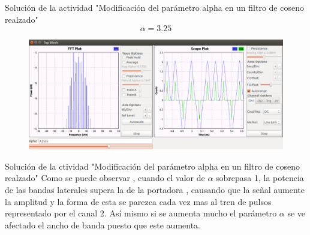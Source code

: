 \begin{frame}{Solución de la actividad "Modificación del parámetro alpha en un filtro de coseno realzado"}
$$\alpha=3.25$$
\begin{figure}
\includegraphics[width=1.05\textwidth]{soluciones/actividad-5-1/pdf/lab5_10.pdf}
\end{figure}
\end{frame}
\begin{frame}{Solución de la ctividad "Modificación del parámetro alpha en un filtro de coseno realzado"}
\justifying
Como se puede observar , cuando el valor de $\alpha$ sobrepasa 1, la potencia de las bandas laterales supera la de la portadora , causando que la señal aumente la amplitud y la forma de esta se parezca cada vez mas al tren de pulsos representado por el canal 2. Así mismo si se aumenta mucho el parámetro $\alpha$ se ve afectado el ancho de banda puesto que este aumenta.
\end{frame}